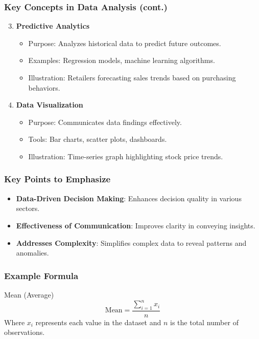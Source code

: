 \documentclass[aspectratio=169]{beamer}
\begin{document}
\begin{frame}[fragile]
    \frametitle{Key Concepts in Data Analysis (cont.)}
    \begin{enumerate}
        \setcounter{enumi}{2} %
        \item \textbf{Predictive Analytics}
            \begin{itemize}
                \item Purpose: Analyzes historical data to predict future outcomes.
                \item Examples: Regression models, machine learning algorithms.
                \item Illustration: Retailers forecasting sales trends based on purchasing behaviors.
            \end{itemize}

        \item \textbf{Data Visualization}
            \begin{itemize}
                \item Purpose: Communicates data findings effectively.
                \item Tools: Bar charts, scatter plots, dashboards.
                \item Illustration: Time-series graph highlighting stock price trends.
            \end{itemize}
    \end{enumerate}
\end{frame}

\begin{frame}[fragile]
    \frametitle{Key Points to Emphasize}
    \begin{itemize}
        \item \textbf{Data-Driven Decision Making}: Enhances decision quality in various sectors.
        \item \textbf{Effectiveness of Communication}: Improves clarity in conveying insights.
        \item \textbf{Addresses Complexity}: Simplifies complex data to reveal patterns and anomalies.
    \end{itemize}
\end{frame}

\begin{frame}[fragile]
    \frametitle{Example Formula}
    \begin{block}{Mean (Average)}
        \begin{equation}
            \text{Mean} = \frac{\sum_{i=1}^{n} x_i}{n}
        \end{equation}
        Where \( x_i \) represents each value in the dataset and \( n \) is the total number of observations.
    \end{block}
\end{frame}
\end{document}

